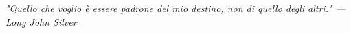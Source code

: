 \documentclass[twoside,openright,titlepage,fleqn,
	headinclude,12pt,a4paper,BCOR5mm,footinclude]{scrbook}
\begin{document}
\frenchspacing
\raggedbottom
{}
\pagestyle{plain}

\pagestyle{scrheadings}
\tableofcontents
\cleardoublepage
\thispagestyle{empty}
\begin{flushright}
\null{}
\emph{"Quello che voglio è essere padrone del mio destino, non di quello degli altri." \break --- Long John Silver} \null
\end{flushright}







\end{document}
